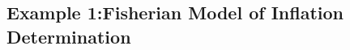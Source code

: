 \documentclass[12pt,reqno]{article}
\numberwithin{equation}{section}
\begin{document}

\subsection*{Example 1:Fisherian Model of Inflation Determination}
\end{document}
